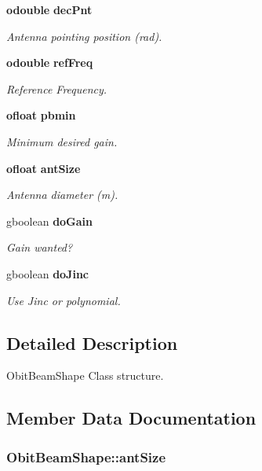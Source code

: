 \begin{CompactItemize}
{\bf odouble} {\bf dec\-Pnt}
\begin{CompactList}\small\item\em Antenna pointing position (rad). \item\end{CompactList}\item 
{\bf odouble} {\bf ref\-Freq}
\begin{CompactList}\small\item\em Reference Frequency. \item\end{CompactList}\item 
{\bf ofloat} {\bf pbmin}
\begin{CompactList}\small\item\em Minimum desired gain. \item\end{CompactList}\item 
{\bf ofloat} {\bf ant\-Size}
\begin{CompactList}\small\item\em Antenna diameter (m). \item\end{CompactList}\item 
gboolean {\bf do\-Gain}
\begin{CompactList}\small\item\em Gain wanted? \item\end{CompactList}\item 
gboolean {\bf do\-Jinc}
\begin{CompactList}\small\item\em Use Jinc or polynomial. \item\end{CompactList}\end{CompactItemize}


\subsection{Detailed Description}
Obit\-Beam\-Shape Class structure. 



\subsection{Member Data Documentation}
\subsubsection{ {\bf Obit\-Beam\-Shape::ant\-Size}}\label{structObitBeamShape_o9}


